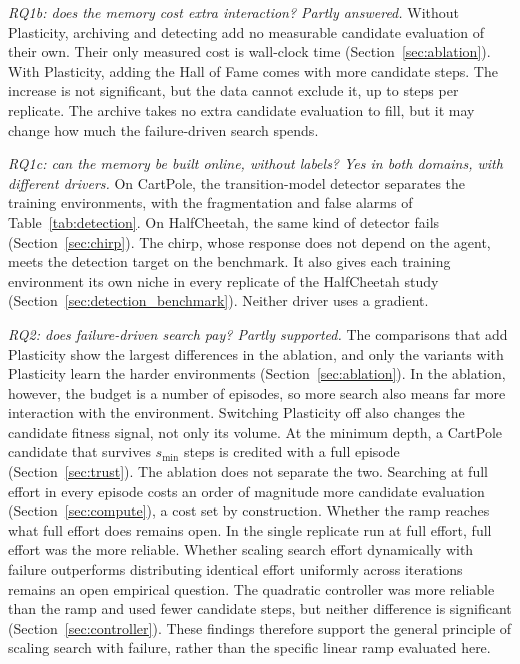 \textit{RQ1b: does the memory cost extra interaction? Partly answered.} Without Plasticity, archiving and detecting add no measurable candidate evaluation of their own. Their only measured cost is wall-clock time (Section~\ref{sec:ablation}). With Plasticity, adding the Hall of Fame comes with more candidate steps. The increase is not significant, but the data cannot exclude it, up to  steps per replicate. The archive takes no extra candidate evaluation to fill, but it may change how much the failure-driven search spends.

\textit{RQ1c: can the memory be built online, without labels? Yes in both domains, with different drivers.} On CartPole, the transition-model detector separates the training environments, with the fragmentation and false alarms of Table~\ref{tab:detection}. On HalfCheetah, the same kind of detector fails (Section~\ref{sec:chirp}). The chirp, whose response does not depend on the agent, meets the detection target on the benchmark. It also gives each training environment its own niche in every replicate of the HalfCheetah study (Section~\ref{sec:detection_benchmark}). Neither driver uses a gradient.

\textit{RQ2: does failure-driven search pay? Partly supported.} The comparisons that add Plasticity show the largest differences in the ablation, and only the variants with Plasticity learn the harder environments (Section~\ref{sec:ablation}). In the ablation, however, the budget is a number of episodes, so more search also means far more interaction with the environment. Switching Plasticity off also changes the candidate fitness signal, not only its volume. At the minimum depth, a CartPole candidate that survives $s_{\min}$ steps is credited with a full episode (Section~\ref{sec:trust}). The ablation does not separate the two. Searching at full effort in every episode costs an order of magnitude more candidate evaluation (Section~\ref{sec:compute}), a cost set by construction. Whether the ramp reaches what full effort does remains open. In the single replicate run at full effort, full effort was the more reliable. Whether scaling search effort dynamically with failure outperforms distributing identical effort uniformly across iterations remains an open empirical question. The quadratic controller was more reliable than the ramp and used fewer candidate steps, but neither difference is significant (Section~\ref{sec:controller}). These findings therefore support the general principle of scaling search with failure, rather than the specific linear ramp evaluated here.

